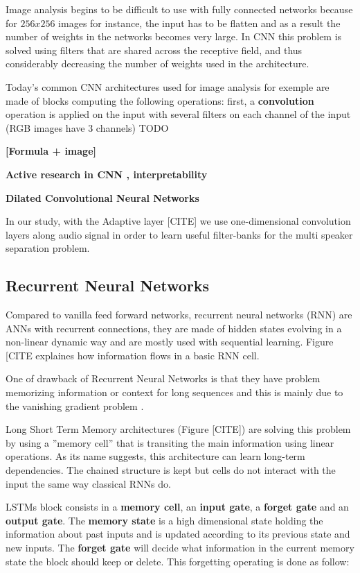 \documentclass[master,final,11pt]{iscs-thesis}
\begin{document}
Image analysis begins to be difficult to use with fully connected networks because for $256x256$ images for instance, the input has to be flatten and as a result the number of weights in the networks becomes very large. In CNN this problem is solved using filters that are shared across the receptive field, and thus considerably decreasing the number of weights used in the architecture.

Today's common CNN architectures used for image analysis for exemple are made of blocks computing the following operations: first, a \textbf{convolution} operation is applied on the input with several filters on each channel of the input (RGB images have 3 channels) TODO

\textbf{[Formula + image]
}

\textbf{Active research in CNN , interpretability 
}

\textbf{Dilated Convolutional Neural Networks
}

In our study, with the Adaptive layer [CITE] we use one-dimensional convolution layers along audio signal in order to learn useful filter-banks for the multi speaker separation problem.

\subsection{Recurrent Neural Networks}

Compared to vanilla feed forward networks, recurrent neural networks (RNN) are ANNs with recurrent connections, they are made of hidden states evolving in a non-linear dynamic way and
are mostly used with sequential learning. Figure [CITE explaines how information flows in a basic RNN cell.

One of drawback of Recurrent Neural Networks is that they have problem memorizing information or context for long sequences and this is mainly due to the vanishing gradient problem \cite{RNNexploding}.

Long Short Term Memory architectures \cite{LSTM} (Figure [CITE]) are solving this problem by using a ''memory cell'' that is transiting the main information using linear operations. As its name suggests, this architecture can learn long-term dependencies.
The chained structure is kept but cells do not interact with the input the same way classical RNNs do. 

LSTMs block consists in a \textbf{memory cell}, an \textbf{input gate}, a \textbf{forget gate} and an \textbf{output gate}.
The \textbf{memory state} is a high dimensional state holding the information about past inputs and is updated according to its previous state and new inputs.
The \textbf{forget gate} will decide what information in the current memory state the block should keep or delete. This forgetting operating is done as follow:
\end{document}

